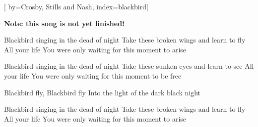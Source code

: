 

[%
    by={Crosby, Stills and Nash},
    index={blackbird}]


    \label{blackbird}

    \textbf{Note: this song is not yet finished!}

    \beginverse
        Blackbird singing in the dead of night
        Take these broken wings and learn to fly
        All your life
        You were only waiting for this moment to arise
    \endverse

    \beginverse
        Blackbird singing in the dead of night
        Take these sunken eyes and learn to see
        All your life
        You were only waiting for this moment to be free
    \endverse

    \beginchorus
        \lrep Blackbird fly, Blackbird fly
        Into the light of the dark black night \rrep {}
    \endchorus

    \beginverse
        Blackbird singing in the dead of night
        Take these broken wings and learn to fly
        All your life
        You were only waiting for this moment to arise 
    \endverse
\endsong
